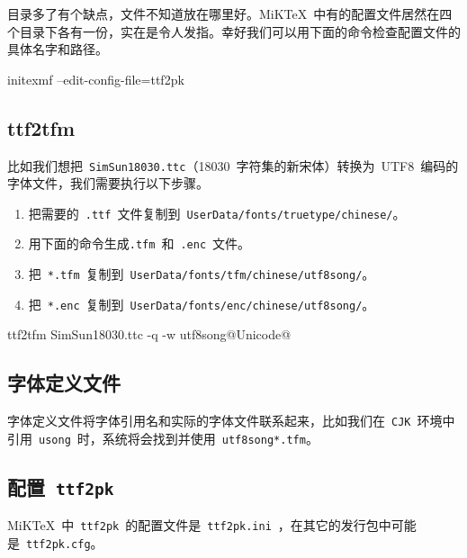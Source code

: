 目录多了有个缺点，文件不知道放在哪里好。MiKTeX~中有的配置文件居然在四个目录下各有一份，实在是令人发指。幸好我们可以用下面的命令检查配置文件的具体名字和路径。

\begin{code}
initexmf --edit-config-file=ttf2pk
\end{code}

\subsection{ttf2tfm}
比如我们想把~\verb|SimSun18030.ttc|（18030~字符集的新宋体）转换为~UTF8~编码的字体文件，我们需要执行以下步骤。

\begin{enumerate}
    \item 把需要的~\verb|.ttf|~文件复制到~\verb|UserData/fonts/truetype/chinese/|。
    \item 用下面的命令生成\verb|.tfm|~和~\verb|.enc|~文件。
    \item 把~\verb|*.tfm|~复制到~\verb|UserData/fonts/tfm/chinese/utf8song/|。
    \item 把~\verb|*.enc|~复制到~\verb|UserData/fonts/enc/chinese/utf8song/|。
\end{enumerate}

\begin{code}
ttf2tfm SimSun18030.ttc -q -w utf8song@Unicode@
\end{code}

\subsection{字体定义文件}
字体定义文件将字体引用名和实际的字体文件联系起来，比如我们在~\verb|CJK|~环境中引用~\verb|usong|~时，系统将会找到并使用~\verb|utf8song*.tfm|。


\subsection{配置~\texttt{ttf2pk}}
MiKTeX~中~\verb|ttf2pk|~的配置文件是~\verb|ttf2pk.ini|~，在其它的发行包中可能是~\verb|ttf2pk.cfg|。

